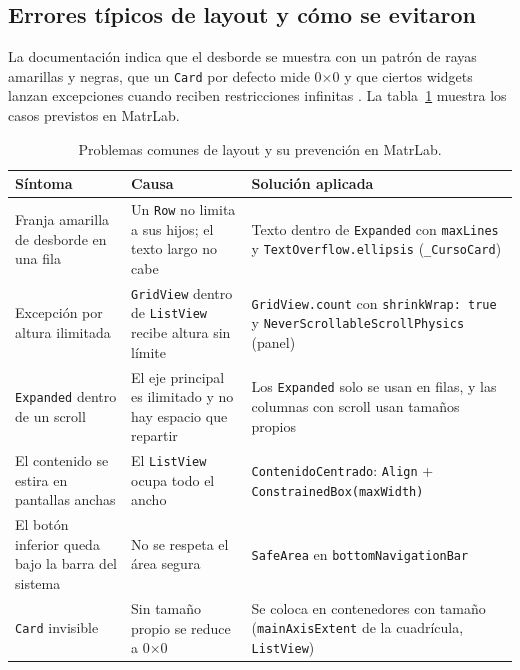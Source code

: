\subsection{Errores típicos de layout y cómo se evitaron}
\label{sec:errores}
La documentación indica que el desborde se muestra con un patrón de rayas amarillas y negras, que un \texttt{Card} por defecto mide 0$\times$0 y que ciertos widgets lanzan excepciones cuando reciben restricciones infinitas \cite{flutterlayout,flutterconstr}. La tabla~\ref{tab:errores} muestra los casos previstos en MatrLab.

\begin{table}[H]
	\centering\footnotesize
	\begin{tabularx}{\textwidth}{|p{4.0cm}|X|X|}
		\hline
		\rowcolor{tablebackground}\color{white}\textbf{Síntoma} & \color{white}\textbf{Causa} & \color{white}\textbf{Solución aplicada}\\
		\hline
		Franja amarilla de desborde en una fila & Un \texttt{Row} no limita a sus hijos; el texto largo no cabe \cite{flutterconstr} & Texto dentro de \texttt{Expanded} con \texttt{maxLines} y \texttt{TextOverflow.ellipsis} (\texttt{\_CursoCard}) \\\hline
		Excepción por altura ilimitada & \texttt{GridView} dentro de \texttt{ListView} recibe altura sin límite \cite{flutterconstr} & \texttt{GridView.count} con \texttt{shrinkWrap: true} y \texttt{NeverScrollableScrollPhysics} (panel) \\\hline
		\texttt{Expanded} dentro de un scroll & El eje principal es ilimitado y no hay espacio que repartir \cite{flutterconstr} & Los \texttt{Expanded} solo se usan en filas, y las columnas con scroll usan tamaños propios \\\hline
		El contenido se estira en pantallas anchas & El \texttt{ListView} ocupa todo el ancho & \texttt{ContenidoCentrado}: \texttt{Align} + \texttt{ConstrainedBox(maxWidth)} \\\hline
		El botón inferior queda bajo la barra del sistema & No se respeta el área segura & \texttt{SafeArea} en \texttt{bottomNavigationBar} \\\hline
		\texttt{Card} invisible & Sin tamaño propio se reduce a 0$\times$0 \cite{flutterlayout} & Se coloca en contenedores con tamaño (\texttt{mainAxisExtent} de la cuadrícula, \texttt{ListView}) \\\hline
	\end{tabularx}
	\caption{Problemas comunes de layout y su prevención en MatrLab.}
	\label{tab:errores}
\end{table}
